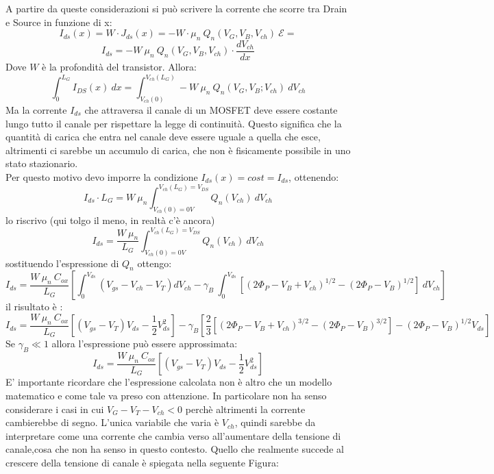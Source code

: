 A partire da queste considerazioni si può scrivere la corrente che scorre tra Drain e Source in funzione di x:
%
\begin{equation*}
    I_{ds}(x)=W \cdot J_{ds}(x)=-W\cdot \mu_n\ Q_n(V_G,V_B,V_{ch})\ \mathcal{E}=
\end{equation*}
%
\begin{equation}
    I_{ds}=-W\ \mu_n\ Q_n(V_G,V_B,V_{ch})\cdot \dfrac{dV_{ch}}{dx}
\end{equation}
Dove $W$ è la profondità del transistor. 
Allora:
\begin{equation}
    \int_{0}^{L_G}I_{DS}(x) \ dx =\int_{V_{ch}(0)}^{V_{ch}(L_G)}-W\ \mu_n\ Q_n(V_G,V_B;V_{ch})\ dV_{ch}
\end{equation}
Ma la corrente $I_{ds}$ che attraversa il canale di un MOSFET deve essere costante lungo tutto il canale per rispettare la legge di continuità. Questo significa che la quantità di carica che entra nel canale deve essere uguale a quella che esce, altrimenti ci sarebbe un accumulo di carica, che non è fisicamente possibile in uno stato stazionario.\\
Per questo motivo devo imporre la condizione $I_{ds}(x) = cost = I_{ds}$, ottenendo:
%
\begin{equation*}
    I_{ds} \cdot L_G=W\ \mu_n \int_{V_{ch}(0)=0V}^{V_{ch}(L_G)=V_{DS}} Q_n(V_{ch})\ dV_{ch}
\end{equation*}
%
lo riscrivo (qui tolgo il meno, in realtà c'è ancora)
%
\begin{equation}
    I_{ds}=\dfrac{W\ \mu_n}{L_G} \int_{V_{ch}(0)=0V}^{V_{ch}(L_G)=V_{DS}} Q_n(V_{ch})\ dV_{ch}
\end{equation}
%
sostituendo l'espressione di $Q_n$ ottengo:
%
\begin{equation}
    I_{ds}=\dfrac{W\ \mu_n\ C_{ox}}{L_G} \left[\int_{0}^{V_{ds}} (V_{gs}-V_{ch}-V_T)dV_{ch}-\gamma_B \ \int_{0}^{V_{ds}}[(2\Phi_P-V_B+V_{ch})^{1/2}-(2\Phi_P-V_B)^{1/2}]\  dV_{ch}\right]
\end{equation}
%
il risultato è :
%
\begin{equation}
    I_{ds}= \dfrac{W\ \mu_n\ C_{ox}}{L_G}\left[ (V_{gs}-V_T)V_{ds}-\dfrac{1}{2}V_{ds}^2\right]-\gamma_B \left[ \dfrac{2}{3}[(2\Phi_P-V_B+V_{ch})^{3/2}-(2\Phi_P-V_B)^{3/2}]-(2\Phi_P-V_{B})^{1/2}V_{ds}\right]
\end{equation}
%
Se $\gamma_B \ll 1$ allora l'espressione può essere approssimata:
%
\begin{equation}
    I_{ds}= \dfrac{W\ \mu_n\ C_{ox}}{L_G}\left[ (V_{gs}-V_T)V_{ds}-\dfrac{1}{2}V_{ds}^2 \right]
\end{equation}
%
E' importante ricordare che l'espressione calcolata non è altro che un modello matematico e come tale va preso con attenzione. In particolare non ha senso considerare i casi in cui $V_G-V_T-V_{ch} <0$ perchè altrimenti la corrente cambierebbe di segno. L'unica variabile che varia è $V_{ch}$, quindi sarebbe da interpretare come una corrente che cambia verso all'aumentare della tensione di canale,cosa che non ha senso in questo contesto.
Quello che realmente succede al crescere della tensione di canale è spiegata nella seguente Figura:

